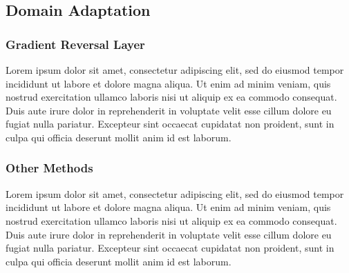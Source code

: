 \documentclass[12pt]{article}
\begin{document}
\subsection{Domain Adaptation}
\subsubsection{Gradient Reversal Layer}
Lorem ipsum dolor sit amet, consectetur adipiscing elit, sed do eiusmod tempor incididunt ut labore et dolore magna aliqua. Ut enim ad minim veniam, quis nostrud exercitation ullamco laboris nisi ut aliquip ex ea commodo consequat. Duis aute irure dolor in reprehenderit in voluptate velit esse cillum dolore eu fugiat nulla pariatur. Excepteur sint occaecat cupidatat non proident, sunt in culpa qui officia deserunt mollit anim id est laborum.
\subsubsection{Other Methods}
Lorem ipsum dolor sit amet, consectetur adipiscing elit, sed do eiusmod tempor incididunt ut labore et dolore magna aliqua. Ut enim ad minim veniam, quis nostrud exercitation ullamco laboris nisi ut aliquip ex ea commodo consequat. Duis aute irure dolor in reprehenderit in voluptate velit esse cillum dolore eu fugiat nulla pariatur. Excepteur sint occaecat cupidatat non proident, sunt in culpa qui officia deserunt mollit anim id est laborum.
\end{document}
